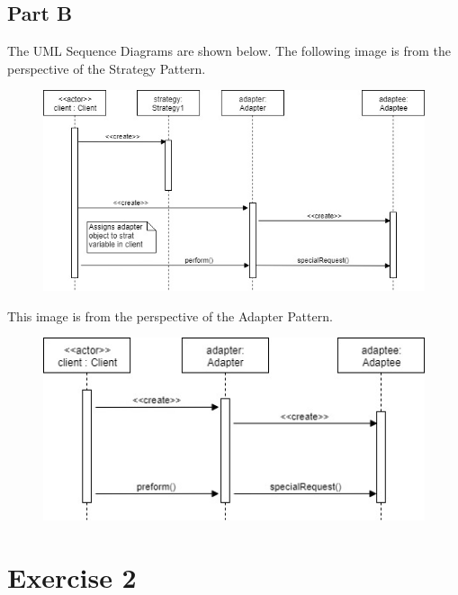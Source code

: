 \documentclass{article}
\begin{document}
\subsection*{Part B}
The UML Sequence Diagrams are shown below. The following image is from the perspective of the Strategy Pattern.
\begin{figure}[h]
	\centering
	\includegraphics[width=5in]{hw3-strat-sequence.jpg}
\end{figure}
\newpage
This image is from the perspective of the Adapter Pattern.
\begin{figure}[h]
	\centering
	\includegraphics[width=5in]{hw3-adapt-sequence.jpg}
\end{figure}
\newpage

\section*{Exercise 2}
\end{document}
